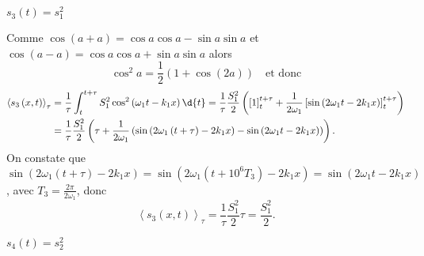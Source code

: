 


\begin{enonce}
$s_3\left( t \right) = s_1^2 $
\end{enonce}
		
			
\begin{corrige}
	Comme $\cos \left( a+a \right) =  \cos a \cos a - \sin a \sin a$ et $\cos \left( a-a \right) =  \cos a \cos a + \sin a \sin a$ alors $$\cos^2 a = \frac{1}{2}\left( 1 + \cos\left( 2a \right) \right) \quad \text{et donc}$$
	\begin{align*}
		\left< s_3\left( x,t \right) \right>_{\tau} &= \frac{1}{\tau} \int_t^{t+\tau} S_1^2 \cos^2 \left( \omega_1 t - k_1 x \right) \d{t} = \frac{1}{\tau} \frac{S_1^2}{2} \left(\left[1\right]^{t+\tau}_{t} + \frac{1}{2\omega_1}\left[\sin\left( 2 \omega_1 t - 2 k_1 x \right)\right]^{t+\tau}_{t} \right)\\
		&= \frac{1}{\tau} \frac{S_1^2}{2} \left(\tau + \frac{1}{2\omega_1}\left(\sin\left( 2 \omega_1 \left(t+\tau\right) - 2 k_1 x \right)-\sin\left( 2 \omega_1 t - 2 k_1 x \right)\right)\right).
	\end{align*}
	On constate que $\sin\left( 2 \omega_1 \left(t+\tau\right) - 2 k_1 x \right) = \sin\left( 2 \omega_1 \left( t+10^6T_3 \right) - 2 k_1 x \right) = \sin\left( 2 \omega_1 t - 2 k_1 x \right)$, avec $T_3 = \frac{2\pi}{2\omega_1}$, donc
	$$
	\left< s_3\left( x,t \right) \right>_{\tau} = \frac{1}{\tau} \frac{S_1^2}{2} \tau = \frac{S_1^2}{2}.
	$$
\end{corrige}



\begin{enonce}
	$s_4\left( t \right) = s_2^2 $
\end{enonce}
			
				
